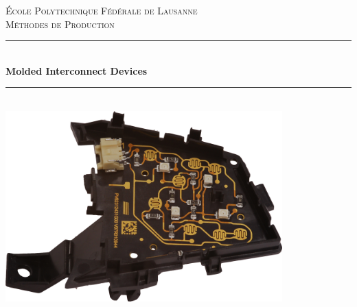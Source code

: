 \begin{titlepage}

\newcommand{\HRule}{\rule{\linewidth}{0.5mm}} %

\center %
\textsc{\LARGE École Polytechnique Fédérale de Lausanne}\\[1.5cm] %
\textsc{\Large Méthodes de Production}\\[0.5cm] %

\HRule \\[0.4cm]
{ \huge \bfseries Molded Interconnect Devices}\\[0.4cm] %
\HRule \\[1.5cm]
 
\includegraphics[width=0.8\textwidth]{images/mid_example}\\[3cm] 



\end{titlepage}
